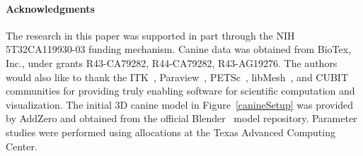 \documentclass{article}
\begin{document}
\paragraph{Acknowledgments}
The research in this paper was supported in part through the NIH
5T32CA119930-03 funding mechanism.  Canine data was obtained from
BioTex, Inc., under grants R43-CA79282, R44-CA79282, R43-AG19276.
The authors would also like to thank the
ITK~\cite{ITKSoftwareGuideSecondEdition}, Paraview~\cite{Paraview},
PETSc~\cite{petsc-manual}, libMesh~\cite{libMesh}, and
CUBIT~\cite{cubit} communities for providing truly enabling
software for scientific computation and visualization.  The initial
3D canine model in Figure~\ref{canineSetup} was provided by AddZero
and obtained from the official
Blender~\cite{roosendaal2000official} model repository.  Parameter
studies were performed using allocations  at the Texas Advanced
Computing Center. 
\end{document}
